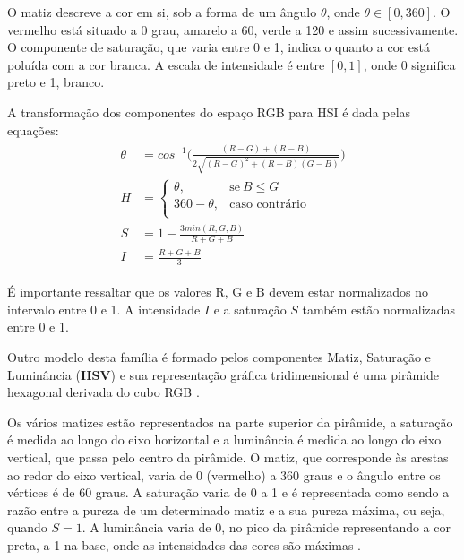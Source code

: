 O matiz descreve a cor em si, sob a forma de um ângulo $\theta$, onde $\theta \in [0, 360]$. O vermelho está situado a 0 grau, amarelo a 60, verde a 120 e assim sucessivamente. O componente de saturação, que varia entre 0 e 1, indica o quanto a cor está poluída com a cor branca. A escala de intensidade é entre $[0, 1]$, onde 0 significa preto e 1, branco.

A transformação dos componentes do espaço RGB para HSI é dada pelas equações:
\begin{align}
\label{eq:rgb_para_hsi}
\begin{split}
  \theta &= cos^{-1} \bigg( \frac{(R - G) + (R - B)}{2 \sqrt{(R - G)^2 + (R - B)(G - B)}} \bigg)
  \\[0.5em]
  H &= \begin{cases}
            \theta,       & \text{se}\ B \leq G\\
            360 - \theta, & \text{caso contrário}\\
       \end{cases}
  \\[0.5em]
  S &= 1 - \frac{3 min(R, G, B)}{R + G + B}
  \\[0.5em]
  I &= \frac{R + G + B}{3}
\end{split}
\end{align}

É importante ressaltar que os valores R, G e B devem estar normalizados no intervalo entre 0 e 1. A intensidade $I$ e a saturação $S$ também estão normalizadas entre 0 e 1.

Outro modelo desta família é formado pelos componentes Matiz, Saturação e Luminância (\textbf{HSV}) e sua representação gráfica tridimensional é uma pirâmide hexagonal derivada do cubo RGB \citep{pedrini:08}.

Os vários matizes estão representados na parte superior da pirâmide, a saturação é medida ao longo do eixo horizontal e a luminância é medida ao longo do eixo vertical, que passa pelo centro da pirâmide. O matiz, que corresponde às arestas ao redor do eixo vertical, varia de 0 (vermelho) a 360 graus e o ângulo entre os vértices é de 60 graus. A saturação varia de 0 a 1 e é representada como sendo a razão entre a pureza de um determinado matiz e a sua pureza máxima, ou seja, quando $S = 1$. A luminância varia de 0, no pico da pirâmide representando a cor preta, a 1 na base, onde as intensidades das cores são máximas \citep{pedrini:08}.

